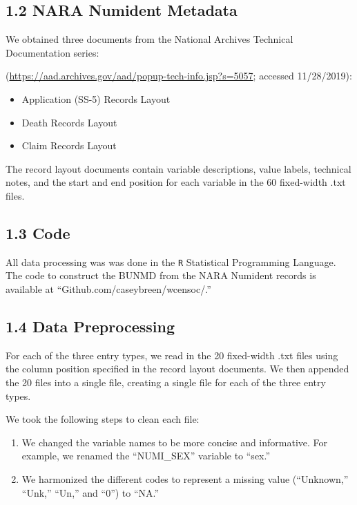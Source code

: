 \documentclass[
  11pt,
]{article}
\providecommand{\tightlist}{%
  \setlength{\itemsep}{0pt}\setlength{\parskip}{0pt}}
\begin{document}
\hypertarget{nara-numident-metadata}{%
\subsection{1.2 NARA Numident Metadata}\label{nara-numident-metadata}}

We obtained three documents from the National Archives Technical
Documentation series:

(\url{https://aad.archives.gov/aad/popup-tech-info.jsp?s=5057}; accessed
11/28/2019):

\begin{itemize}
\tightlist
\item
  Application (SS-5) Records Layout
\item
  Death Records Layout
\item
  Claim Records Layout
\end{itemize}

The record layout documents contain variable descriptions, value labels,
technical notes, and the start and end position for each variable in the
60 fixed-width .txt files.

\hypertarget{code}{%
\subsection{1.3 Code}\label{code}}

All data processing was was done in the \texttt{R} Statistical
Programming Language. The code to construct the BUNMD from the NARA
Numident records is available at ``Github.com/caseybreen/wcensoc/.''

\hypertarget{data-preprocessing}{%
\subsection{1.4 Data Preprocessing}\label{data-preprocessing}}

For each of the three entry types, we read in the 20 fixed-width .txt
files using the column position specified in the record layout
documents. We then appended the 20 files into a single file, creating a
single file for each of the three entry types.

We took the following steps to clean each file:

\begin{enumerate}
\def\labelenumi{\arabic{enumi}.}
\item
  We changed the variable names to be more concise and informative. For
  example, we renamed the ``NUMI\_SEX'' variable to ``sex.''
\item
  We harmonized the different codes to represent a missing value
  (``Unknown,'' ``Unk,'' ``Un,'' and ``0'') to ``NA.''
\end{enumerate}
\end{document}

